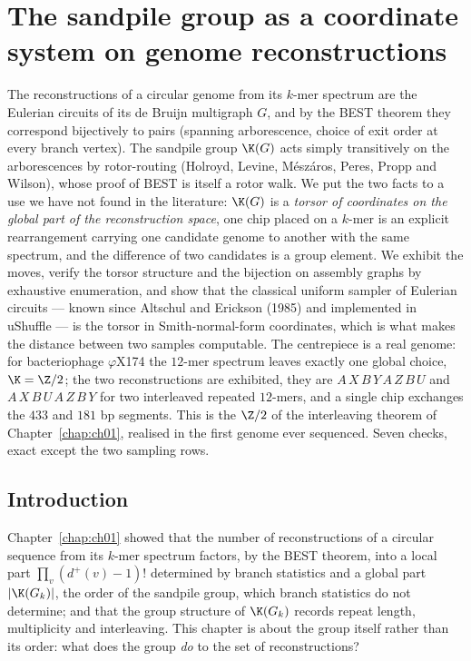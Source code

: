 \chapter[The sandpile group as a coordinate system]{The sandpile group as a coordinate system on genome reconstructions}\label{chap:ch02}
\begin{chaptersummary}
The reconstructions of a circular genome from its $k$-mer spectrum are the Eulerian
circuits of its de Bruijn multigraph $G$, and by the BEST theorem they correspond
bijectively to pairs (spanning arborescence, choice of exit order at every branch vertex).
The sandpile group $\K(G)$ acts simply transitively on the arborescences by rotor-routing
(Holroyd, Levine, M\'esz\'aros, Peres, Propp and Wilson), whose proof of BEST is itself a
rotor walk. We put the two facts to a use we have not found in the literature: $\K(G)$ is
a \emph{torsor of coordinates on the global part of the reconstruction space}, one chip
placed on a $k$-mer is an explicit rearrangement carrying one candidate genome to another
with the same spectrum, and the difference of two candidates is a group element. We
exhibit the moves, verify the torsor structure and the bijection on assembly graphs by
exhaustive enumeration, and show that the classical uniform sampler of Eulerian circuits
--- known since Altschul and Erickson (1985) and implemented in uShuffle --- is the torsor
in Smith-normal-form coordinates, which is what makes the distance between two samples
computable. The centrepiece is a real genome: for bacteriophage $\varphi$X174 the $12$-mer
spectrum leaves exactly one global choice, $\K=\Z/2$; the two reconstructions are
exhibited, they are $A\,X\,B\,Y\,A\,Z\,B\,U$ and $A\,X\,B\,U\,A\,Z\,B\,Y$ for two interleaved
repeated $12$-mers, and a single chip exchanges the $433$ and $181$ bp segments. This is
the $\Z/2$ of the interleaving theorem of Chapter~\ref{chap:ch01}, realised in the first
genome ever sequenced. Seven checks, exact except the two sampling rows.
\end{chaptersummary}

\section{Introduction}\label{ch02:sec:intro}

Chapter~\ref{chap:ch01} showed that the number of reconstructions of a circular
sequence from its $k$-mer spectrum factors, by the BEST theorem, into a local part
$\prod_v(d^+(v)-1)!$ determined by branch statistics and a global part $|\K(G_k)|$, the
order of the sandpile group, which branch statistics do not determine; and that the group
structure of $\K(G_k)$ records repeat length, multiplicity and interleaving. This chapter is
about the group itself rather than its order: what does the group \emph{do} to the set of
reconstructions?

